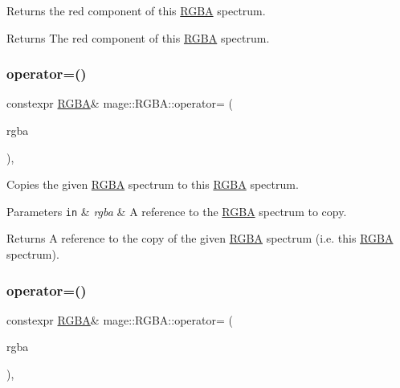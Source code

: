Returns the red component of this \mbox{\hyperlink{structmage_1_1_r_g_b_a}{R\+G\+BA}} spectrum.

\begin{DoxyReturn}{Returns}
The red component of this \mbox{\hyperlink{structmage_1_1_r_g_b_a}{R\+G\+BA}} spectrum. 
\end{DoxyReturn}
\mbox{\label{structmage_1_1_r_g_b_a_af8b32f51870ad86f65e5307337b42420}} 
\subsubsection{\texorpdfstring{operator=()}{operator=()}\hspace{0.1cm}{\footnotesize\ttfamily [1/2]}}
{\footnotesize\ttfamily constexpr \mbox{\hyperlink{structmage_1_1_r_g_b_a}{R\+G\+BA}}\& mage\+::\+R\+G\+B\+A\+::operator= (\begin{DoxyParamCaption}\item[{const \mbox{\hyperlink{structmage_1_1_r_g_b_a}{R\+G\+BA}} \&}]{rgba }\end{DoxyParamCaption})\hspace{0.3cm}{\ttfamily [default]}, {\ttfamily [noexcept]}}

Copies the given \mbox{\hyperlink{structmage_1_1_r_g_b_a}{R\+G\+BA}} spectrum to this \mbox{\hyperlink{structmage_1_1_r_g_b_a}{R\+G\+BA}} spectrum.


\begin{DoxyParams}[1]{Parameters}
\mbox{\tt in}  & {\em rgba} & A reference to the \mbox{\hyperlink{structmage_1_1_r_g_b_a}{R\+G\+BA}} spectrum to copy. \\
\hline
\end{DoxyParams}
\begin{DoxyReturn}{Returns}
A reference to the copy of the given \mbox{\hyperlink{structmage_1_1_r_g_b_a}{R\+G\+BA}} spectrum (i.\+e. this \mbox{\hyperlink{structmage_1_1_r_g_b_a}{R\+G\+BA}} spectrum). 
\end{DoxyReturn}
\mbox{\label{structmage_1_1_r_g_b_a_a66f6476166086849d031b99b458e6f7c}} 
\subsubsection{\texorpdfstring{operator=()}{operator=()}\hspace{0.1cm}{\footnotesize\ttfamily [2/2]}}
{\footnotesize\ttfamily constexpr \mbox{\hyperlink{structmage_1_1_r_g_b_a}{R\+G\+BA}}\& mage\+::\+R\+G\+B\+A\+::operator= (\begin{DoxyParamCaption}\item[{\mbox{\hyperlink{structmage_1_1_r_g_b_a}{R\+G\+BA}} \&\&}]{rgba }\end{DoxyParamCaption})\hspace{0.3cm}{\ttfamily [default]}, {\ttfamily [noexcept]}}

